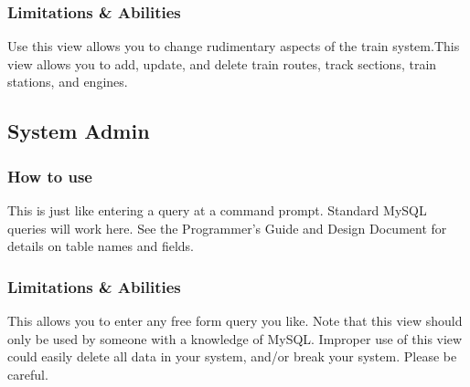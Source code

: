 \documentclass[letter]{article}
\begin{document}
\subsubsection{Limitations \& Abilities}
Use this view allows you to change rudimentary aspects of the train system.This view allows you to add, update, and delete train routes, track sections, train stations, and engines.


\subsection{System Admin}
\subsubsection{How to use}
This is just like entering a query at a command prompt. Standard MySQL queries will work here. See the Programmer's Guide and Design Document for details on table names and fields.

\subsubsection{Limitations \& Abilities}
This allows you to enter any free form query you like. Note that this view should only be used by someone with a knowledge of MySQL. Improper use of this view could easily delete all data in your system, and/or break your system. Please be careful.


\end{document}
